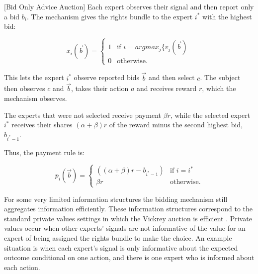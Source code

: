 \begin{mech}\label{mech:BidOnly}[Bid Only Advice Auction]
 	Each expert observes their signal and then report only a bid $b_i$. The mechanism gives the rights bundle to the expert $i^*$ with the highest bid:
 	
 	   $$x_i(\vec{b}) = \begin{cases} 1 & \text{if } i = argmax_j \{v_j(\vec b)\ \\ 0 & \text{otherwise.} \end{cases}$$
	
 	
 	This lets the expert $i^*$ observe reported bids $\vec{b}$ and then select $c$.
 	The subject then observes $c$ and $\vec{b}$, takes their action $a$ and receives reward $r$, which the mechanism observes. 
 	
 	The experts that were not selected receive  payment $\beta r$, while the selected expert $i^*$ receives their shares $(\alpha + \beta) r$ of the reward minus the second highest bid, $b_{i^*-1}$.
 	
 	Thus, the payment rule is:
 	
 	$$p_i(\vec b)= \begin{cases} ((\alpha + \beta)r - b_{i^*-1})& \text{if }i = i^* \\ \beta r & \text{otherwise.} \end{cases}$$

 \end{mech}
 
 For some very limited information structures the bidding mechanism still aggregates information efficiently. 
 These information structures correspond to the standard private values settings in which the Vickrey auction is efficient \citep{vickrey1961}.
 Private values occur when other experts' signals are not informative of the value for an expert of being assigned the rights bundle to make the choice.%
 An example situation is when each expert's signal is only informative about the expected outcome conditional on one action, and  there is one expert who is informed about each action.
 
